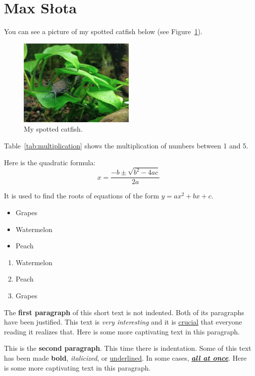 \section{Max Słota}
\label{sec:slotamax}

You can see a picture of my spotted catfish below (see Figure~\ref{fig:fish}).

\begin{figure}[htbp]
    \centering
    \includegraphics[width=0.5\textwidth]{pictures/fish.jpg}
    \caption{My spotted catfish.}
    \label{fig:fish}
\end{figure}

Table~\ref{tab:multiplication} shows the multiplication of numbers between 1 and 5.


Here is the quadratic formula: \[x=\frac{-b\pm\sqrt{b^2-4ac}}{2a}\]

It is used to find the roots of equations of the form $y=ax^2+bx+c$.

\newpage
{}
\begin{itemize}
\renewcommand\labelitemi{+}
    \item Grapes
    \item Watermelon
    \item Peach
\end{itemize}

\begin{enumerate}
    \item Watermelon
    \item Peach
    \item Grapes
\end{enumerate}

\vspace{5mm}\noindent The \textbf{first paragraph} of this short text is not indented. Both of its paragraphs have been justified. This text is \emph{very interesting} and it is \underline{crucial} that everyone reading it realizes that. Here is some more captivating text in this paragraph.

This is the \textbf{second paragraph}. This time there is indentation. Some of this text has been made \textbf{bold}, \textit{italicized}, or \underline{underlined}. In some cases, \textbf{\emph{\underline{all at once}}}. Here is some more captivating text in this paragraph.